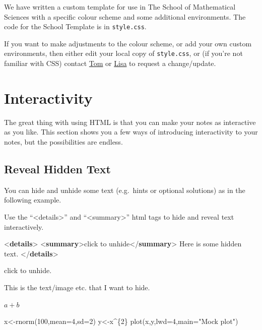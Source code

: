 \documentclass[
  letterpaper,
]{article}
\newenvironment{Shaded}{\begin{snugshade}}{\end{snugshade}}
\newcommand{\AttributeTok}[1]{\textcolor[rgb]{0.40,0.45,0.13}{#1}}
\newcommand{\DataTypeTok}[1]{\textcolor[rgb]{0.68,0.00,0.00}{#1}}
\newcommand{\DecValTok}[1]{\textcolor[rgb]{0.68,0.00,0.00}{#1}}
\newcommand{\FunctionTok}[1]{\textcolor[rgb]{0.28,0.35,0.67}{#1}}
\newcommand{\KeywordTok}[1]{\textcolor[rgb]{0.00,0.23,0.31}{\textbf{#1}}}
\newcommand{\NormalTok}[1]{\textcolor[rgb]{0.00,0.23,0.31}{#1}}
\newcommand{\OtherTok}[1]{\textcolor[rgb]{0.00,0.23,0.31}{#1}}
\newcommand{\SpecialCharTok}[1]{\textcolor[rgb]{0.37,0.37,0.37}{#1}}
\newcommand{\StringTok}[1]{\textcolor[rgb]{0.13,0.47,0.30}{#1}}
\numberwithin{equation}{section}
\numberwithin{figure}{section}
\theoremstyle{break}
\begin{document}
We have written a custom template for use in The School of Mathematical
Sciences with a specific colour scheme and some additional environments.
The code for the School Template is in \texttt{style.css}.

If you want to make adjustments to the colour scheme, or add your own
custom environments, then either edit your local copy of
\texttt{style.css}, or (if you're not familiar with CSS) contact
\href{mailto:tom.wicks@nottingham.ac.uk}{Tom} or
\href{mailto:lisa.mott@nottingham.ac.uk}{Lisa} to request a
change/update.


\section{Interactivity}\label{interactivity}

The great thing with using HTML is that you can make your notes as
interactive as you like. This section shows you a few ways of
introducing interactivity to your notes, but the possibilities are
endless.

\subsection{Reveal Hidden Text}\label{reveal-hidden-text}

You can hide and unhide some text (e.g.~hints or optional solutions) as
in the following example.

Use the ``\textless details\textgreater{}'' and
``\textless summary\textgreater{}'' html tags to hide and reveal text
interactively.

\begin{Shaded}
\begin{Highlighting}[]
\DataTypeTok{\textless{}}\KeywordTok{details}\DataTypeTok{\textgreater{}}
  \DataTypeTok{\textless{}}\KeywordTok{summary}\DataTypeTok{\textgreater{}}\NormalTok{click to unhide}\DataTypeTok{\textless{}/}\KeywordTok{summary}\DataTypeTok{\textgreater{}}
\NormalTok{  Here is some hidden text.}
\DataTypeTok{\textless{}/}\KeywordTok{details}\DataTypeTok{\textgreater{}}
\end{Highlighting}
\end{Shaded}

click to unhide.

This is the text/image etc. that I want to hide.

\(a+b\)

\begin{Shaded}
\begin{Highlighting}[]
\NormalTok{x}\OtherTok{\textless{}{-}}\FunctionTok{rnorm}\NormalTok{(}\DecValTok{100}\NormalTok{,}\AttributeTok{mean=}\DecValTok{4}\NormalTok{,}\AttributeTok{sd=}\DecValTok{2}\NormalTok{)}
\NormalTok{y}\OtherTok{\textless{}{-}}\NormalTok{x}\SpecialCharTok{\^{}}\NormalTok{\{}\DecValTok{2}\NormalTok{\}}
\FunctionTok{plot}\NormalTok{(x,y,}\AttributeTok{lwd=}\DecValTok{4}\NormalTok{,}\AttributeTok{main=}\StringTok{"Mock plot"}\NormalTok{)}
\end{Highlighting}
\end{Shaded}
\end{document}
